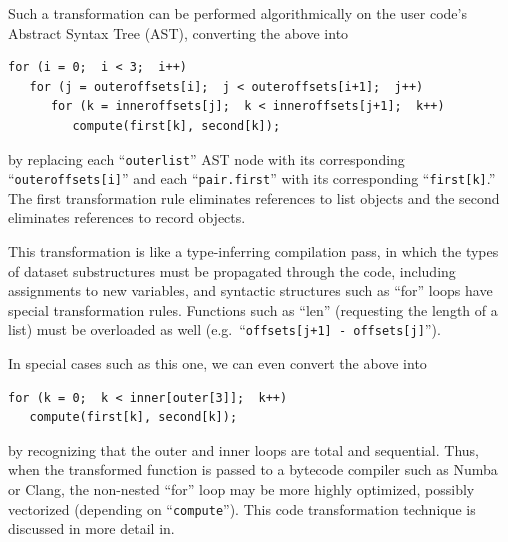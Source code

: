 \documentclass[a4paper]{jpconf}
\begin{document}
Such a transformation can be performed algorithmically on the user code's Abstract Syntax Tree (AST), converting the above into
\begin{center}
\begin{minipage}{0.7\linewidth}
\begin{verbatim}
for (i = 0;  i < 3;  i++)
   for (j = outeroffsets[i];  j < outeroffsets[i+1];  j++)
      for (k = inneroffsets[j];  k < inneroffsets[j+1];  k++)
         compute(first[k], second[k]);
\end{verbatim}
\end{minipage}
\end{center}
by replacing each ``{\tt outerlist}'' AST node with its corresponding ``{\tt outeroffsets[i]}'' and each ``{\tt pair.first}'' with its corresponding ``{\tt first[k]}.'' The first transformation rule eliminates references to list objects and the second eliminates references to record objects.

This transformation is like a type-inferring compilation pass, in which the types of dataset substructures must be propagated through the code, including assignments to new variables, and syntactic structures such as ``for'' loops have special transformation rules. Functions such as ``len'' (requesting the length of a list) must be overloaded as well (e.g.\ ``{\tt offsets[j+1] - offsets[j]}'').

In special cases such as this one, we can even convert the above into
\begin{center}
\begin{minipage}{0.7\linewidth}
\begin{verbatim}
for (k = 0;  k < inner[outer[3]];  k++)
   compute(first[k], second[k]);
\end{verbatim}
\end{minipage}
\end{center}
by recognizing that the outer and inner loops are total and sequential. Thus, when the transformed function is passed to a bytecode compiler such as Numba or Clang, the non-nested ``for'' loop may be more highly optimized, possibly vectorized (depending on ``{\tt compute}''). This code transformation technique is discussed in more detail in\cite{ieee}.
\end{document}
